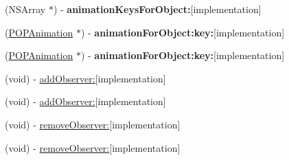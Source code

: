 \begin{DoxyCompactItemize}
\mbox{\label{interface_p_o_p_animator_a384e31ee7f7810f678e4868932ea5c60}} 
(N\+S\+Array $\ast$) -\/ {\bfseries animation\+Keys\+For\+Object\+:}{\ttfamily  \mbox{[}implementation\mbox{]}}
\item 
\mbox{\label{interface_p_o_p_animator_ada12d286d0be521709a3ce3c5506218e}} 
(\mbox{\hyperlink{interface_p_o_p_animation}{P\+O\+P\+Animation}} $\ast$) -\/ {\bfseries animation\+For\+Object\+:key\+:}{\ttfamily  \mbox{[}implementation\mbox{]}}
\item 
\mbox{\label{interface_p_o_p_animator_ada12d286d0be521709a3ce3c5506218e}} 
(\mbox{\hyperlink{interface_p_o_p_animation}{P\+O\+P\+Animation}} $\ast$) -\/ {\bfseries animation\+For\+Object\+:key\+:}{\ttfamily  \mbox{[}implementation\mbox{]}}
\item 
(void) -\/ \mbox{\hyperlink{interface_p_o_p_animator_a5384718da6fd07fcaa8465d4ef79fd2f}{add\+Observer\+:}}{\ttfamily  \mbox{[}implementation\mbox{]}}
\item 
(void) -\/ \mbox{\hyperlink{interface_p_o_p_animator_a5384718da6fd07fcaa8465d4ef79fd2f}{add\+Observer\+:}}{\ttfamily  \mbox{[}implementation\mbox{]}}
\item 
(void) -\/ \mbox{\hyperlink{interface_p_o_p_animator_adc71ca908923f51bfab999a4e0beeb76}{remove\+Observer\+:}}{\ttfamily  \mbox{[}implementation\mbox{]}}
\item 
(void) -\/ \mbox{\hyperlink{interface_p_o_p_animator_adc71ca908923f51bfab999a4e0beeb76}{remove\+Observer\+:}}{\ttfamily  \mbox{[}implementation\mbox{]}}
\end{DoxyCompactItemize}
